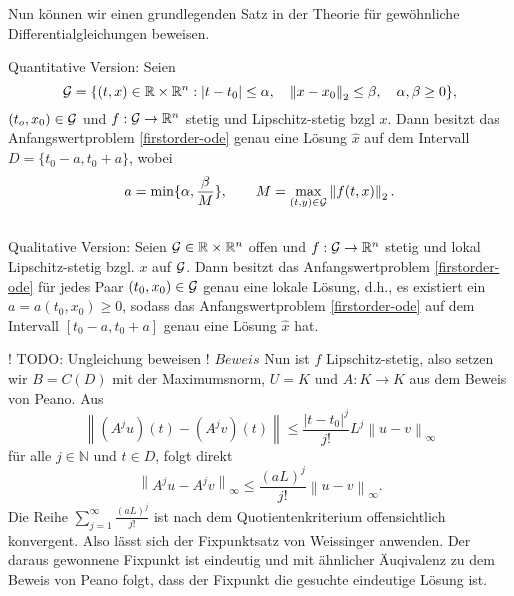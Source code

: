 Nun können wir einen grundlegenden Satz in der Theorie für gewöhnliche Differentialgleichungen beweisen.
\begin{satz}
    Quantitative Version: Seien
    \[
            {\cal G}=\{(t,x) \in \mathbb{R} \times \mathbb{R}^{n}: |t-t_{0}| \leq \alpha, \quad
        \left\lVert x-x_{0} \right\rVert _{2} \leq\beta, \quad \alpha,\beta \geq 0 \},
    \]
    $(t_{o},x_{0})\in {\cal G}$ und $f:{\cal G} \rightarrow \mathbb{R}^{n}$ stetig und Lipschitz-stetig bzgl $x$.
    Dann besitzt das Anfangswertproblem \eqref{firstorder-ode} genau eine Lösung $\hat{x}$ auf dem Intervall
    $D=\{t_{0}-a,t_{0}+a\}$, wobei
    \[
        a=\min\{\alpha, \frac{\beta}{M}\}, \qquad M= \max_{(t,y)\in {\cal G}}\left\lVert f(t,x)\right\rVert_{2} .
    \]\\
    Qualitative Version: Seien ${\cal G}\in \mathbb{R} \times \mathbb{R}^{n}$ offen und $f:{\cal G} \rightarrow \mathbb{R}^{n}$ stetig
    und lokal Lipschitz-stetig bzgl. $x$ auf $\cal{G}$. Dann besitzt das Anfangswertproblem \eqref{firstorder-ode} für
    jedes Paar $(t_{0},x_{0}) \in {\cal G}$ genau eine lokale Lösung, d.h., es existiert ein $a=a(t_{0},x_{0}) \geq 0$,
    sodass das Anfangswertproblem \eqref{firstorder-ode} auf dem Intervall $[t_{0}-a,t_{0}+a]$ genau eine Lösung
    $\hat{x}$ hat.
\end{satz}
! TODO: Ungleichung beweisen !
$Beweis$ Nun ist $f$ Lipschitz-stetig, also setzen wir $B=C(D)$ mit der Maximumsnorm, $U=K$ und $A:K \rightarrow K$
aus dem Beweis von Peano. Aus
\[
    \left\lVert (A^j u)(t) - (A^j v)(t) \right\rVert \leq \frac{|t-t_0|^j}{j!} L^j\left\lVert u - v \right\rVert_{\infty}
\]
für alle $j \in \mathbb{N}$ und $t \in D$, folgt direkt
\[
    \left\lVert A^j u - A^j v \right\rVert_{\infty} \leq \frac{(aL)^j}{j!} \left\lVert u - v \right\rVert_{\infty}.
\]
Die Reihe $\sum_{j=1}^{\infty} \frac{(aL)^j}{j!} $ ist nach dem Quotientenkriterium offensichtlich konvergent. Also
lässt sich der Fixpunktsatz von Weissinger anwenden. Der daraus gewonnene Fixpunkt ist eindeutig und mit ähnlicher
Äuqivalenz zu dem Beweis von Peano folgt, dass der Fixpunkt die gesuchte eindeutige Lösung ist. \qedwhite

